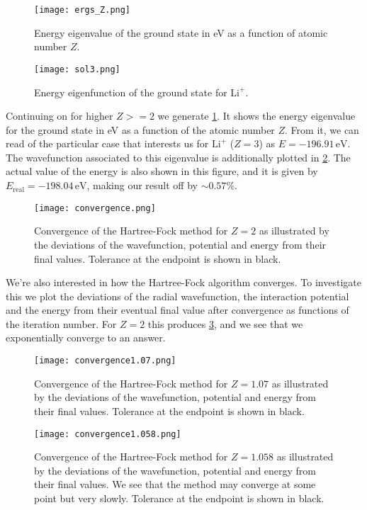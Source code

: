 \documentclass[10pt,a4paper,twocolumn]{article}
\begin{document}
\begin{figure}
    \centering
    \texttt{[image: ergs\_Z.png]}
    \caption{Energy eigenvalue of the ground state in eV as a function of atomic number $Z$.}
    \label{fig:ergs_Z}
\end{figure}

\begin{figure}[!h]
    \centering
    \texttt{[image: sol3.png]}
    \caption{Energy eigenfunction of the ground state for $\mathrm{Li}^+$.}
    \label{fig:sol3}
\end{figure}

Continuing on for higher $Z>=2$ we generate \cref{fig:ergs_Z}. It shows the energy eigenvalue for the ground state in eV as a function of the atomic number $Z$. From it, we can read of the particular case that interests us for $\mathrm{Li}^+$ ($Z=3$) as $E = -196.91\,\mathrm{eV}$. The wavefunction associated to this eigenvalue is additionally plotted in \cref{fig:sol3}. The actual value of the energy is also shown in this figure, and it is given by $E_{\mathrm{real}} = -198.04\,\mathrm{eV}$, making our result off by $\sim\! 0.57\%$.

\begin{figure}[!hb]
    \centering
    \texttt{[image: convergence.png]}
    \caption{Convergence of the Hartree-Fock method for $Z=2$ as illustrated by the deviations of the wavefunction, potential and energy from their final values. Tolerance at the endpoint is shown in black.}
    \label{fig:conv1}
\end{figure}


We're also interested in how the Hartree-Fock algorithm converges. To investigate this we plot the deviations of the radial wavefunction, the interaction potential and the energy from their eventual final value after convergence as functions of the iteration number. For $Z = 2$ this produces \cref{fig:conv1}, and we see that we exponentially converge to an answer.

\begin{figure}[h!]
    \centering
    \texttt{[image: convergence1.07.png]}
    \caption{Convergence of the Hartree-Fock method for $Z=1.07$ as illustrated by the deviations of the wavefunction, potential and energy from their final values. Tolerance at the endpoint is shown in black.}
    \label{fig:conv2}
\end{figure}

\begin{figure}[h!]
    \centering
    \texttt{[image: convergence1.058.png]}
    \caption{Convergence of the Hartree-Fock method for $Z=1.058$ as illustrated by the deviations of the wavefunction, potential and energy from their final values. We see that the method may converge at some point but very slowly. Tolerance at the endpoint is shown in black.}
    \label{fig:conv3}
\end{figure}
\end{document}
